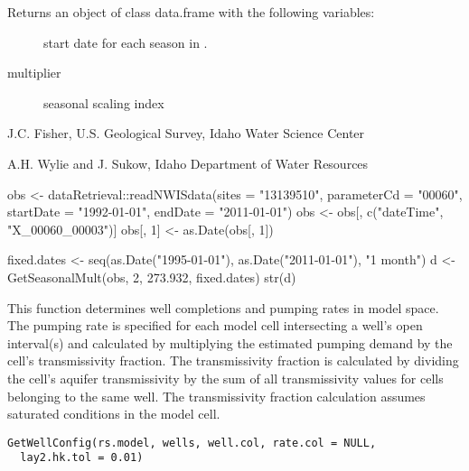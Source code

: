 \documentclass[a4paper]{book}
\begin{document}
%
\begin{Value}
Returns an object of class data.frame with the following variables:
\begin{description}

\item[] start date for each season in .
\item[multiplier] seasonal scaling index

\end{description}

\end{Value}
%
\begin{Author}\relax
J.C. Fisher, U.S. Geological Survey, Idaho Water Science Center

A.H. Wylie and J. Sukow, Idaho Department of Water Resources
\end{Author}
%
\begin{Examples}
\begin{ExampleCode}
obs <- dataRetrieval::readNWISdata(sites = "13139510", parameterCd = "00060",
                                   startDate = "1992-01-01", endDate = "2011-01-01")
obs <- obs[, c("dateTime", "X_00060_00003")]
obs[, 1] <- as.Date(obs[, 1])

fixed.dates <- seq(as.Date("1995-01-01"), as.Date("2011-01-01"), "1 month")
d <- GetSeasonalMult(obs, 2, 273.932, fixed.dates)
str(d)

\end{ExampleCode}
\end{Examples}
%
\begin{Description}\relax
This function determines well completions and pumping rates in model space.
The pumping rate is specified for each model cell intersecting a well's open interval(s)
and calculated by multiplying the estimated pumping demand by the cell's transmissivity fraction.
The transmissivity fraction is calculated by dividing the cell's aquifer transmissivity by
the sum of all transmissivity values for cells belonging to the same well.
The transmissivity fraction calculation assumes saturated conditions in the model cell.
\end{Description}
%
\begin{Usage}
\begin{verbatim}
GetWellConfig(rs.model, wells, well.col, rate.col = NULL,
  lay2.hk.tol = 0.01)
\end{verbatim}
\end{Usage}
\end{document}
